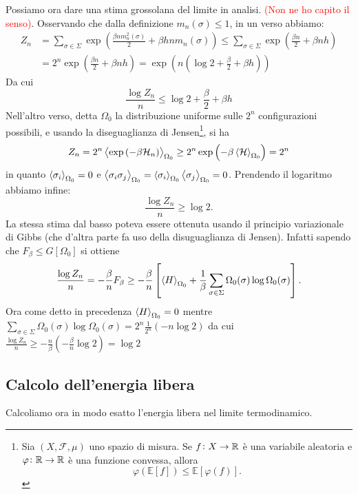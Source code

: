 Possiamo ora dare una stima grossolana del limite in analisi. \textcolor{red}{(Non ne ho capito il senso)}. Osservando che dalla definizione $ m_n(\sigma) \leq 1 $, in un verso abbiamo:
\begin{align*}
    Z_n & = \sum_{\sigma \in \Sigma} \exp\left( \frac{\beta n m_n^2(\sigma)}{2} + \beta h n m_n(\sigma) \right) \leq \sum_{\sigma \in \Sigma} \exp\left(  \frac{\beta n}{2} + \beta n h \right) \\
    & = 2^n \exp\left( \frac{\beta n}{2} + \beta n h\right) = \exp\left( n \left( \log 2 + \frac{\beta}{2} + \beta h \right) \right)
\end{align*}
Da cui
\[ \frac{\log Z_n}{n} \leq \log 2 + \frac{\beta}{2} + \beta h \]
Nell'altro verso, detta $ \Omega_0 $ la distribuzione uniforme sulle $ 2^n $ configurazioni possibili, e usando la diseguaglianza di Jensen\footnote{Sia $ (X, \mathcal{F}, \mu) $ uno spazio di misura. Se $ f \colon X \to \mathbb{R} $ è una variabile aleatoria e $ \varphi \colon \mathbb{R} \to \mathbb{R} $ è una funzione convessa, allora \[\varphi\left(\mathbb{E}\left[f\right]\right) \leq \mathbb{E}\left[\varphi(f)\right].\]}, si ha
\[
    Z_n = 2^n \left< \exp\left(-\beta\mathcal{H}_n\right) \right>_{\Omega_0} \geq 2^n \exp\left( -\beta \left< \mathcal{H} \right>_{\Omega_0} \right) = 2^n
\]
in quanto $ \left< \sigma_i \right>_{\Omega_0} = 0 $ e $ \left< \sigma_i\sigma_j \right>_{\Omega_0} = \left< \sigma_i \right>_{\Omega_0}\left< \sigma_j \right>_{\Omega_0} = 0 $. Prendendo il logaritmo abbiamo infine:
\[ \frac{\log Z_n}{n} \geq \log 2. \]
La stessa stima dal basso poteva essere ottenuta usando il principio variazionale di Gibbs (che d'altra parte fa uso della disuguaglianza di Jensen). Infatti sapendo che $ F_\beta \leq G[\Omega_0] $ si ottiene
\[ \frac{\log Z_n}{n} = -\frac{\beta}{n} F_\beta \geq -\frac{\beta}{n} \left[\left< H \right>_{\Omega_0} + \frac{1}{\beta} \sum_{\sigma \in \Sigma} \Omega_0(\sigma) \log{\Omega_0(\sigma)}\right]. \]
Ora come detto in precedenza $ \left< H \right>_{\Omega_0} = 0 $ mentre $ \sum_{\sigma \in \Sigma} \Omega_0(\sigma) \log{\Omega_0(\sigma)} = 2^{n} \frac{1}{2^{n}} (- n \log{2}) $ da cui $ \frac{\log Z_n}{n} \geq -\frac{n}{\beta}\left(-\frac{\beta}{n} \log{2}\right) = \log{2} $

\subsection{Calcolo dell'energia libera}
Calcoliamo ora in modo esatto l'energia libera nel limite termodinamico.

